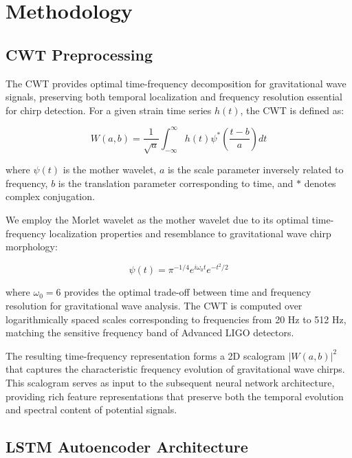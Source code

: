 \documentclass{iopjournal}
\begin{document}
\section{Methodology}

\subsection{CWT Preprocessing}

The CWT provides optimal time-frequency decomposition for gravitational wave signals, preserving both temporal localization and frequency resolution essential for chirp detection. For a given strain time series $h(t)$, the CWT is defined as:

\begin{equation}
W(a,b) = \frac{1}{\sqrt{a}} \int_{-\infty}^{\infty} h(t) \psi^*\left(\frac{t-b}{a}\right) dt
\end{equation}

where $\psi(t)$ is the mother wavelet, $a$ is the scale parameter inversely related to frequency, $b$ is the translation parameter corresponding to time, and $*$ denotes complex conjugation.

We employ the Morlet wavelet as the mother wavelet due to its optimal time-frequency localization properties and resemblance to gravitational wave chirp morphology:

\begin{equation}
\psi(t) = \pi^{-1/4} e^{i\omega_0 t} e^{-t^2/2}
\end{equation}

where $\omega_0 = 6$ provides the optimal trade-off between time and frequency resolution for gravitational wave analysis. The CWT is computed over logarithmically spaced scales corresponding to frequencies from 20 Hz to 512 Hz, matching the sensitive frequency band of Advanced LIGO detectors.

The resulting time-frequency representation forms a 2D scalogram $|W(a,b)|^2$ that captures the characteristic frequency evolution of gravitational wave chirps. This scalogram serves as input to the subsequent neural network architecture, providing rich feature representations that preserve both the temporal evolution and spectral content of potential signals.

\subsection{LSTM Autoencoder Architecture}
\end{document}

